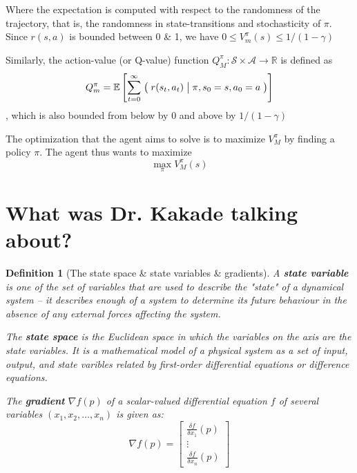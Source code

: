\documentclass[12pt,reqno]{amsart}
\newtheorem{defn}{Definition}
\newcommand{\Cond}[2]{\bigm( {#1} \bigm\vert {#2}\bigm)}
\newcommand{\E}{\mathbb E}
\begin{document}
Where the expectation is computed with respect to the randomness of the trajectory, that is, the randomness in state-transitions and stochasticity of $\pi$. Since $r(s,a)$ is bounded between 0 \& 1, we have $0 \leq V_{m}^{\pi}(s) \leq 1/(1 - \gamma)$

Similarly, the action-value (or Q-value) function $Q_{M}^{\pi} : \mathcal{S} \times \mathcal{A} \rightarrow \mathbb{R}$ is defined as 
\begin{equation}\label{eqn:Q}
Q_{m}^{\pi} = \E \left[\sum\limits_{t = 0}^{\infty} \Cond{r(s_{t},a_{t})}{\pi, s_{0} = s, a_{0} = a}    \right]
\end{equation}
, which is also bounded from below by 0 and above by $1/(1-\gamma)$

\medskip

The optimization that the agent aims to solve is to maximize $V_{M}^{\pi}$ by finding a policy $\pi$. The agent thus wants to maximize
\begin{equation}\label{eqn:optvalues}
\max\limits_{\pi} V_{M}^{\pi}(s)
\end{equation}

\section{What was Dr. Kakade talking about?}
\begin{shaded}
\begin{defn}[The state space \& state variables \& gradients]
A \textbf{state variable} is one of the set of variables that are used to describe the "state" of a dynamical system -- it describes enough of a system to determine its future behaviour in the absence of any external forces affecting the system.

The \textbf{state space} is the Euclidean space in which the variables on the axis are the state variables. It is a mathematical model of a physical system as a set of input, output,  and state varibles related by first-order differential equations or difference equations.

The \textbf{gradient} $\nabla f(p)$ of a scalar-valued differential equation $f$ of several variables $(x_1,x_2, \ldots, x_n)$ is given as:
\begin{equation}
\nabla f(p) = \begin{bmatrix}
\frac{\delta f}{\delta x_1}(p)\\
\vdots\\
\frac{\delta f}{\delta x_n}(p)
\end{bmatrix}
\end{equation}
\end{defn}
\end{shaded}
\end{document}
